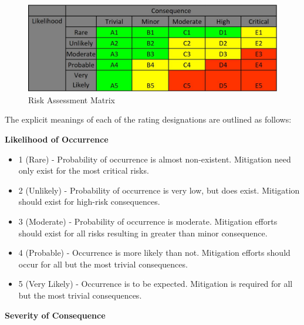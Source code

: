 		\FloatBarrier
		\begin{figure}[h]
			\centering
			\includegraphics[width=0.9\linewidth]{09_Figures/risk_assessment_matrix.jpg}
			\caption{Risk Assessment Matrix}
			\label{fig:risk_assessment_matrix}
		\end{figure}
		\FloatBarrier
		
		\pagebreak
		
		The explicit meanings of each of the rating designations are outlined as follows:
	
		\bigbreak
	
		\textbf{Likelihood of Occurrence}
		\begin{itemize}
			\item 1 (Rare) - Probability of occurrence is almost non-existent. Mitigation need only exist for the most critical risks.
			\item 2 (Unlikely) - Probability of occurrence is very low, but does exist. Mitigation should exist for high-risk consequences.
			\item 3 (Moderate) - Probability of occurrence is moderate. Mitigation efforts should exist for all risks resulting in greater than minor consequence.
			\item 4 (Probable) - Occurrence is more likely than not. Mitigation efforts should occur for all but the most trivial consequences.
			\item 5 (Very Likely) - Occurrence is to be expected. Mitigation is required for all but the most trivial consequences.
		\end{itemize}
	
		\textbf{Severity of Consequence}
		
